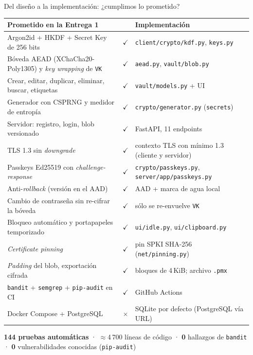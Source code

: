 \documentclass[aspectratio=169,10pt]{beamer}
\newcommand{\key}[1]{\textcolor{cripto}{\texttt{#1}}}
\newcommand{\hecho}{\textcolor{cliente}{$\checkmark$}}
\newcommand{\falta}{\textcolor{servidor}{$\times$}}
\newcommand{\code}[1]{\texttt{\footnotesize #1}}
\begin{document}
\begin{frame}{Del diseño a la implementación: ¿cumplimos lo prometido?}
  \centering\scriptsize
  \renewcommand{\arraystretch}{0.95}
  \begin{tabular}{@{}p{} c p{}@{}}
    \toprule
    \textbf{Prometido en la Entrega 1} & & \textbf{Implementación} \\
    \midrule
    Argon2id + HKDF + Secret Key de 256 bits & \hecho & \code{client/crypto/kdf.py}, \code{keys.py} \\
    Bóveda AEAD (XChaCha20-Poly1305) y \emph{key wrapping} de \key{VK} & \hecho & \code{aead.py}, \code{vault/blob.py} \\
    Crear, editar, duplicar, eliminar, buscar, etiquetas & \hecho & \code{vault/models.py} + UI \\
    Generador con CSPRNG y medidor de entropía & \hecho & \code{crypto/generator.py} (\code{secrets}) \\
    Servidor: registro, login, blob versionado & \hecho & FastAPI, 11 endpoints \\
    TLS 1.3 sin \emph{downgrade} & \hecho & contexto TLS con mínimo 1.3 (cliente y servidor) \\
    Passkeys Ed25519 con \emph{challenge-response} & \hecho & \code{crypto/passkeys.py}, \code{server/app/passkeys.py} \\
    Anti-\emph{rollback} (versión en el AAD) & \hecho & AAD + marca de agua local \\
    Cambio de contraseña sin re-cifrar la bóveda & \hecho & sólo se re-envuelve \key{VK} \\
    Bloqueo automático y portapapeles temporizado & \hecho & \code{ui/idle.py}, \code{ui/clipboard.py} \\
    \emph{Certificate pinning} & \hecho & pin SPKI SHA-256 (\code{net/pinning.py}) \\
    \emph{Padding} del blob, exportación cifrada & \hecho & bloques de 4\,KiB; archivo \code{.pmx} \\
    \texttt{bandit} + \texttt{semgrep} + \texttt{pip-audit} en CI & \hecho & GitHub Actions \\
    Docker Compose + PostgreSQL & \falta & SQLite por defecto (PostgreSQL vía URL) \\
    \bottomrule
  \end{tabular}

  \vspace{2mm}
  {\footnotesize \textbf{144 pruebas automáticas} · $\approx$4\,700 líneas de código · \textbf{0} hallazgos
  de \texttt{bandit} · \textbf{0} vulnerabilidades conocidas (\texttt{pip-audit})}
\end{frame}
\end{document}
